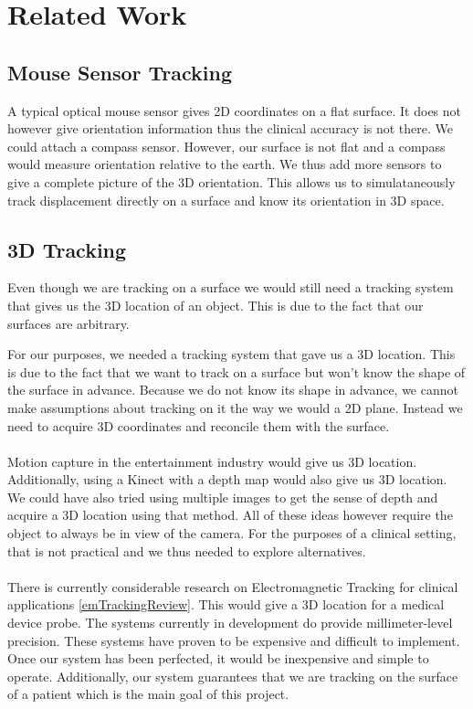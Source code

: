 \section{Related Work}

\subsection{Mouse Sensor Tracking}

A typical optical mouse sensor gives 2D coordinates on a flat surface. It does not however give orientation information thus the clinical accuracy is not there. We could attach a compass sensor. However, our surface is not flat and a compass would measure orientation relative to the earth. We thus add more sensors to give a complete picture of the 3D orientation. This allows us to simulataneously track displacement directly on a surface and know its orientation in 3D space. 

\subsection{3D Tracking}

Even though we are tracking on a surface we would still need a tracking system that gives us the 3D location of an object. This is due to the fact that our surfaces are arbitrary. 

For our purposes, we needed a tracking system that gave us a 3D location. This is due to the fact that we want to track on a surface but won't know the shape of the surface in advance. Because we do not know its shape in advance, we cannot make assumptions about tracking on it the way we would a 2D plane. Instead we need to acquire 3D coordinates and reconcile them with the surface. \\
\\
Motion capture in the entertainment industry would give us 3D location. Additionally, using a Kinect with a depth map would also give us 3D location. We could have also tried using multiple images to get the sense of depth and acquire a 3D location using that method. All of these ideas however require the object to always be in view of the camera. For the purposes of a clinical setting, that is not practical and we thus needed to explore alternatives. \\
\\
There is currently considerable research on Electromagnetic Tracking for clinical applications \ref{emTrackingReview}. This would give a 3D location for a medical device probe. The systems currently in development do provide millimeter-level precision. These systems have proven to be expensive and difficult to implement. Once our system has been perfected, it would be inexpensive and simple to operate. Additionally, our system guarantees that we are tracking on the surface of a patient which is the main goal of this project. 

